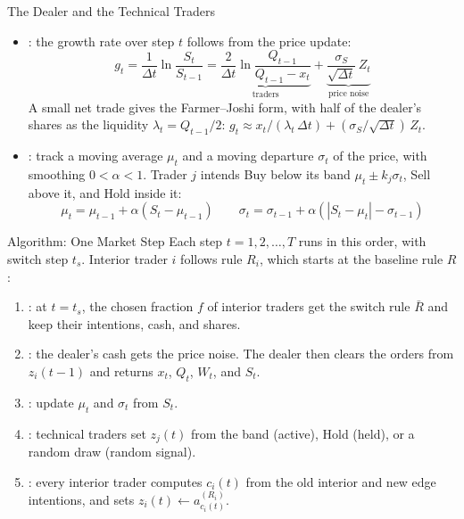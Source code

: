 \documentclass[aspectratio=169,11pt]{beamer}
\begin{document}
\begin{frame}{The Dealer and the Technical Traders}
  \begin{itemize}\setlength{\itemsep}{0.8em}
    \item {}: the growth rate over step $t$ follows from the price
      update:
      \begin{equation*}
        g_{t}=\frac{1}{\Delta t}\ln\frac{S_{t}}{S_{t-1}}=\underbrace{\frac{2}{\Delta t}\ln\frac{Q_{t-1}}{Q_{t-1}-x_{t}}}_{\text{traders}}+\underbrace{\frac{\sigma_{S}}{\sqrt{\Delta t}}\,Z_{t}}_{\text{price noise}}
      \end{equation*}
      A small net trade gives the Farmer--Joshi form, with half of the dealer's shares
      as the liquidity $\lambda_{t}=Q_{t-1}/2$:
      $g_{t}\approx x_{t}/(\lambda_{t}\,\Delta t)+(\sigma_{S}/\sqrt{\Delta t})\,Z_{t}$.
    \item {}: track a moving average $\mu_{t}$ and a moving
      departure $\sigma_{t}$ of the price, with smoothing $0<\alpha<1$. Trader $j$ intends
      Buy below its band $\mu_{t}\pm k_{j}\sigma_{t}$, Sell above it, and Hold inside it:
      \begin{equation*}
        \boxed{\mu_{t}=\mu_{t-1}+\alpha\left(S_{t}-\mu_{t-1}\right)\qquad\sigma_{t}=\sigma_{t-1}+\alpha\left(|S_{t}-\mu_{t}|-\sigma_{t-1}\right)}
      \end{equation*}
  \end{itemize}
\end{frame}

\begin{frame}{Algorithm: One Market Step}
  Each step $t=1,2,\dots,T$ runs in this order, with switch step $t_{s}$.
  Interior trader $i$ follows rule $R_{i}$, which starts at the baseline rule $R$:
  \begin{enumerate}\setlength{\itemsep}{0.3em}
    \item {}: at $t=t_{s}$, the chosen fraction $f$ of interior traders
      get the switch rule $\bar{R}$ and keep their intentions, cash, and shares.
    \item {}: the dealer's cash gets the price noise. The dealer then
      clears the orders from $z_{i}(t-1)$ and returns $x_{t}$, $Q_{t}$, $W_{t}$, and $S_{t}$.
    \item {}: update $\mu_{t}$ and $\sigma_{t}$ from $S_{t}$.
    \item {}: technical traders set $z_{j}(t)$ from the band (active),
      Hold (held), or a random draw (random signal).
    \item {}: every interior trader computes $c_{i}(t)$ from the
      old interior and new edge intentions, and sets $z_{i}(t)\gets a^{(R_{i})}_{c_{i}(t)}$.
  \end{enumerate}
\end{frame}
\end{document}

